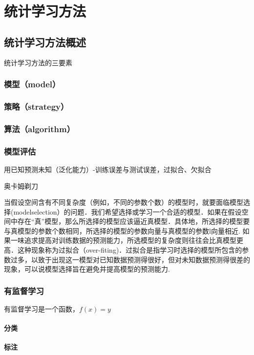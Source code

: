 \chapter{统计学习方法}
    \section{统计学习方法概述}
    统计学习方法的三要素

    \subsection{模型（model）}
    \subsection{策略（strategy）}
    \subsection{算法（algorithm）}    
    \subsection{模型评估}
    用已知预测未知（泛化能力）-训练误差与测试误差，过拟合、欠拟合

    奥卡姆剃刀

    当假设空间含有不同复杂度（例如，不同的参数个数）的模型时，就要面临模型选择(modelselection）的问题．我们希望选择或学习一个合适的模型．如果在假设空间中存在“真”模型，那么所选择的模型应该逼近真模型．具体地，所选择的模型要与真模型的参数个数相同，所选择的模型的参数向量与真模型的参数l向量相近.
    如果一味追求提高对训练数据的预测能力，所选模型的复杂度则往往会比真模型更高．这种现象称为过拟合（over-fiting)．过拟合是指学习时选择的模型所包含的参数过多，以致于出现这一模型对已知数据预测得很好，但对未知数据预测得很差的现象，可以说模型选择旨在避免并提高模型的预测能力.

    
    \subsection{有监督学习}
    有监督学习是一个函数，$f(x)=y$
    \subsubsection{分类}
    \subsubsection{标注}
